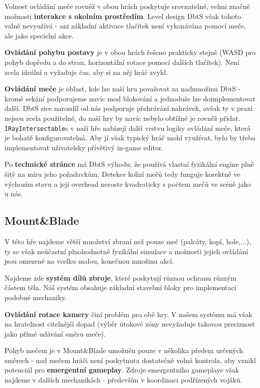 Volnost ovládání meče rovněž v obou hrách poskytuje srovnatelné, velmi značné možnosti \textbf{interakce s okolním prostředím}. Level design \acl{DbtS} však tohoto valně nevyužívá - ani základní aktivace tlačítek není vykonávána pomocí meče, ale jako specielní akce.

\textbf{Ovládání pohybu postavy} je v obou hrách řešeno prakticky stejně (WASD pro pohyb dopředu a do stran, horizontální rotace pomocí dalších tlačítek). Není zcela ideální a vyžaduje čas, aby si na něj hráč zvykl.

\textbf{Ovládání meče} je oblast, kde lze naší hru považovat za nadmnožinu \acl{DbtS} - kromě sekání podporujeme navíc mod blokování a jednoduše lze doimplementovat další. \acl{DbtS} sice narozdíl od nás podporuje přehrávání nahrávek, avšak ty v praxi nejsou zcela použitelné, do naší hry by navíc nebylo obtížné je rovněž přidat. \texttt{IRayIntersectable}s v naší hře nabízejí další vrstvu logiky ovládání meče, která je bohatě konfigurovatelná. Aby jí však typický hráč mohl využívat, bylo by třeba implementovat uživatelsky přívětivý in-game editor.  

Po \textbf{technické stránce} má \acl{DbtS} výhodu, že používá vlastní fyzikální engine plně šitý na míru jeho požadavkům. Detekce kolizí mečů tedy funguje korektně ve výchozím stavu a její overhead neroste kvadraticky s počtem mečů ve scéně jako u nás. 



\subsection{Mount\&Blade}

V této hře najdeme větší množství zbraní než pouze meč (palcáty, kopí, hole,...), ty se však neúčastní plnohodnotně fyzikální simulace a možnosti jejich ovládání jsou omezené na vcelku malou, konečnou množinu akcí. 

Najdeme zde \textbf{systém dílů zbroje}, které poskytují různou ochranu různým částem těla. Náš systém obsahuje základní stavební bloky pro implementaci podobné mechaniky.

\textbf{Ovládání rotace kamery} činí problém pro obě hry. V našem systému má však na hratelnost citelnější dopad (výběr útokové zóny nevyžaduje takovou preciznost jako přímé udávání směru meče).

Pohyb mečem je v Mount\&Blade umožněn pouze v několika předem určených směrech - nad mečem hráči není poskytnuta dostatečně volná kontrola, aby vznikl potenciál pro \textbf{emergentní gameplay}. Zdroje emergentního gameplaye však najdeme v dalších mechanikách - především v koordinaci podřízených vojáků. 


